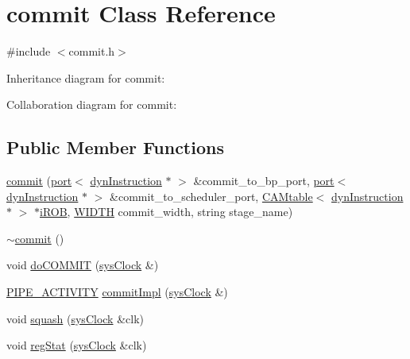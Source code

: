 \hypertarget{classcommit}{
\section{commit Class Reference}
\label{classcommit}
}


{\ttfamily \#include $<$commit.h$>$}



Inheritance diagram for commit:


Collaboration diagram for commit:
\subsection*{Public Member Functions}
\begin{DoxyCompactItemize}
\item 
\hyperlink{classcommit_a41ac90052f6ff381357d12a0b30583a8}{commit} (\hyperlink{classport}{port}$<$ \hyperlink{classdynInstruction}{dynInstruction} $\ast$ $>$ \&commit\_\-to\_\-bp\_\-port, \hyperlink{classport}{port}$<$ \hyperlink{classdynInstruction}{dynInstruction} $\ast$ $>$ \&commit\_\-to\_\-scheduler\_\-port, \hyperlink{classCAMtable}{CAMtable}$<$ \hyperlink{classdynInstruction}{dynInstruction} $\ast$ $>$ $\ast$\hyperlink{backend_2parser_8cpp_ad73ae25f81e6e99482f3fbd5ba9664ce}{iROB}, \hyperlink{global_2global_8h_a6fa2e24b8a418fa215e183264cbea3aa}{WIDTH} commit\_\-width, string stage\_\-name)
\item 
\hyperlink{classcommit_a56b8656334cc14f0f7c9f8f0d7021417}{$\sim$commit} ()
\item 
void \hyperlink{classcommit_a9eb2bb492ac2b103102be4ef7d018e8b}{doCOMMIT} (\hyperlink{classsysClock}{sysClock} \&)
\item 
\hyperlink{unit_2stage_8h_ab00e4188e8b8974fecb1dfd12764cbb1}{PIPE\_\-ACTIVITY} \hyperlink{classcommit_a50f823d551a57bbaccde41c32737b737}{commitImpl} (\hyperlink{classsysClock}{sysClock} \&)
\item 
void \hyperlink{classcommit_afb05caa27f671bb59e3462e161c2c2f1}{squash} (\hyperlink{classsysClock}{sysClock} \&clk)
\item 
void \hyperlink{classcommit_a207fab9b88bbf27cae6f6388aa6ef6ad}{regStat} (\hyperlink{classsysClock}{sysClock} \&clk)
\end{DoxyCompactItemize}


